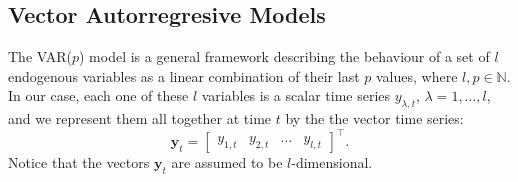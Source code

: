 %
%
%
%
%
%
%
%
%


\subsection{Vector Autorregresive Models}\label{sec:varvec}


The VAR($p$) model is a general framework describing the behaviour of a
set of $l$ endogenous variables as a linear combination of their last $p$
values, where $l,p\in\mathbb{N}$. 
In our case, each one of these $l$ variables is a scalar time series
$y_{\lambda,t}$, $\lambda=1,\dots,l$, and we represent them all together
at time $t$ by the the vector time series:
\begin{equation}
\label{eq:variables}
\mathbf{y}_t = 
\begin{bmatrix} y_{1,t} & y_{2,t} & \dots & y_{l,t} \end{bmatrix}^\top.
\end{equation}
\noindent
Notice that the vectors $\mathbf{y}_t$ are assumed to be $l$-dimensional.

